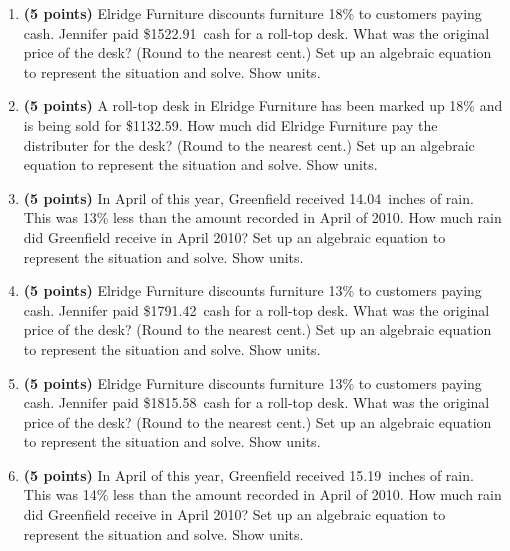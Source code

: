 \documentclass[12pt]{amsart}
\begin{document}
\begin{enumerate}
\vfill 
\def \discount{18}\def \paid{1522.91}\def \rainy{11.69}\def \orcost{1857.21}\def \purcost{1290.60}\def \orrainy{14.26}
\item {\bf (5 points)} 
 Elridge Furniture discounts furniture \discount\% to customers paying cash. Jennifer paid \$\paid\ cash for a roll-top desk. What was the original price of the desk? (Round to the nearest cent.) Set up an algebraic equation to represent the situation and solve. Show units.

\vfill 
\def \discount{18}\def \paid{1132.59}\def \rainy{12.13}\def \orcost{1381.21}\def \purcost{959.82}\def \orrainy{14.79}
\item {\bf (5 points)} 
 A roll-top desk in Elridge Furniture has been marked up \discount\% and is being sold for \$\paid. How much did Elridge Furniture pay the distributer for the desk? (Round to the nearest cent.) Set up an algebraic equation to represent the situation and solve. Show units.

\vfill 
\def \discount{13}\def \paid{1632.77}\def \rainy{14.04}\def \orcost{1876.75}\def \purcost{1444.93}\def \orrainy{16.14}
\item {\bf (5 points)} 
 In April of this year, Greenfield received \rainy\ inches of rain. This was \discount\% less than the amount recorded in April of 2010. How much rain did Greenfield  receive in April 2010? Set up an algebraic equation to represent the situation and solve. Show units.

\vfill 
\def \discount{13}\def \paid{1791.42}\def \rainy{10.86}\def \orcost{2059.10}\def \purcost{1585.33}\def \orrainy{12.48}
\item {\bf (5 points)} 
 Elridge Furniture discounts furniture \discount\% to customers paying cash. Jennifer paid \$\paid\ cash for a roll-top desk. What was the original price of the desk? (Round to the nearest cent.) Set up an algebraic equation to represent the situation and solve. Show units.

\vfill 
\def \discount{13}\def \paid{1815.58}\def \rainy{9.52}\def \orcost{2086.87}\def \purcost{1606.71}\def \orrainy{10.94}
\item {\bf (5 points)} 
 Elridge Furniture discounts furniture \discount\% to customers paying cash. Jennifer paid \$\paid\ cash for a roll-top desk. What was the original price of the desk? (Round to the nearest cent.) Set up an algebraic equation to represent the situation and solve. Show units.

\vfill 
\def \discount{14}\def \paid{1391.07}\def \rainy{15.19}\def \orcost{1617.52}\def \purcost{1220.24}\def \orrainy{17.66}
\item {\bf (5 points)} 
 In April of this year, Greenfield received \rainy\ inches of rain. This was \discount\% less than the amount recorded in April of 2010. How much rain did Greenfield  receive in April 2010? Set up an algebraic equation to represent the situation and solve. Show units.


\end{enumerate}
\end{document}
